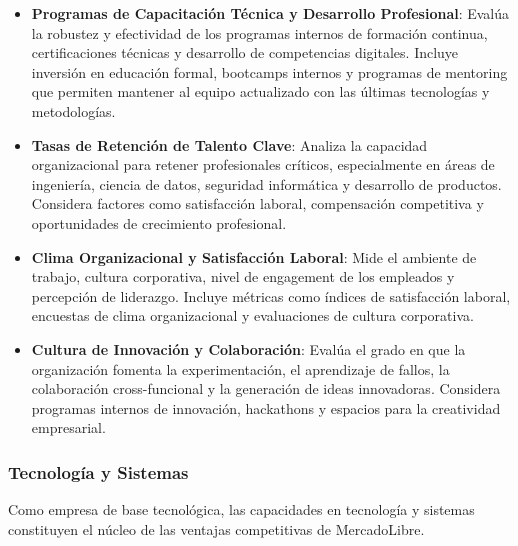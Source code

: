 \begin{itemize}
\item \textbf{Programas de Capacitación Técnica y Desarrollo Profesional}: Evalúa la robustez y efectividad de los programas internos de formación continua, certificaciones técnicas y desarrollo de competencias digitales. Incluye inversión en educación formal, bootcamps internos y programas de mentoring que permiten mantener al equipo actualizado con las últimas tecnologías y metodologías.

\item \textbf{Tasas de Retención de Talento Clave}: Analiza la capacidad organizacional para retener profesionales críticos, especialmente en áreas de ingeniería, ciencia de datos, seguridad informática y desarrollo de productos. Considera factores como satisfacción laboral, compensación competitiva y oportunidades de crecimiento profesional.

\item \textbf{Clima Organizacional y Satisfacción Laboral}: Mide el ambiente de trabajo, cultura corporativa, nivel de engagement de los empleados y percepción de liderazgo. Incluye métricas como índices de satisfacción laboral, encuestas de clima organizacional y evaluaciones de cultura corporativa.

\item \textbf{Cultura de Innovación y Colaboración}: Evalúa el grado en que la organización fomenta la experimentación, el aprendizaje de fallos, la colaboración cross-funcional y la generación de ideas innovadoras. Considera programas internos de innovación, hackathons y espacios para la creatividad empresarial.
\end{itemize}

\subsubsection{Tecnología y Sistemas}

Como empresa de base tecnológica, las capacidades en tecnología y sistemas constituyen el núcleo de las ventajas competitivas de MercadoLibre.

